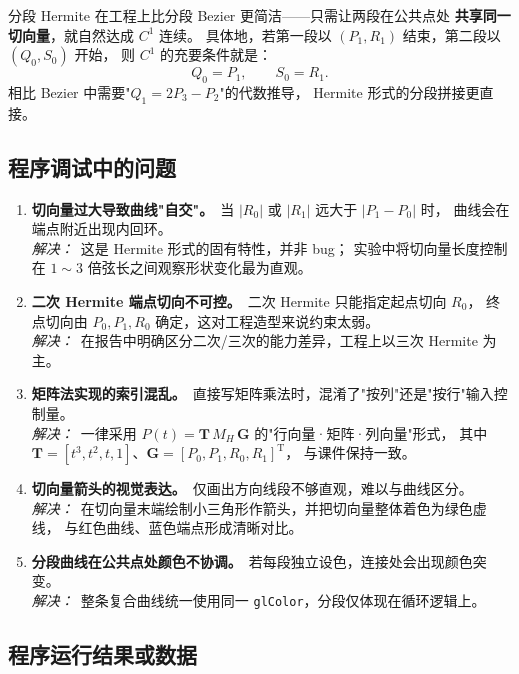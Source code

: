 \documentclass[a4paper,12pt]{ctexart}
\begin{document}
分段 Hermite 在工程上比分段 Bezier 更简洁——只需让两段在公共点处
\textbf{共享同一切向量}，就自然达成 $C^1$ 连续。
具体地，若第一段以 $(P_1,R_1)$ 结束，第二段以 $(Q_0,S_0)$ 开始，
则 $C^1$ 的充要条件就是：
\[
    Q_0 = P_1,\qquad S_0 = R_1.
\]
相比 Bezier 中需要"$Q_1=2P_3-P_2$"的代数推导，
Hermite 形式的分段拼接更直接。

\subsection{程序调试中的问题}

\begin{enumerate}[leftmargin=2em,itemsep=0.4em]
    \item \textbf{切向量过大导致曲线"自交"。}\ 当 $|R_0|$ 或 $|R_1|$ 远大于 $|P_1-P_0|$ 时，
        曲线会在端点附近出现内回环。\\
        \textit{解决：}\ 这是 Hermite 形式的固有特性，并非 bug；
        实验中将切向量长度控制在 $1\sim 3$ 倍弦长之间观察形状变化最为直观。

    \item \textbf{二次 Hermite 端点切向不可控。}\ 二次 Hermite 只能指定起点切向 $R_0$，
        终点切向由 $P_0,P_1,R_0$ 确定，这对工程造型来说约束太弱。\\
        \textit{解决：}\ 在报告中明确区分二次/三次的能力差异，工程上以三次 Hermite 为主。

    \item \textbf{矩阵法实现的索引混乱。}\ 直接写矩阵乘法时，混淆了"按列"还是"按行"输入控制量。\\
        \textit{解决：}\ 一律采用 $P(t)=\mathbf{T}\,M_H\,\mathbf{G}$ 的"行向量·矩阵·列向量"形式，
        其中 $\mathbf{T}=[t^3,t^2,t,1]$、$\mathbf{G}=[P_0,P_1,R_0,R_1]^\mathrm{T}$，
        与课件保持一致。

    \item \textbf{切向量箭头的视觉表达。}\ 仅画出方向线段不够直观，难以与曲线区分。\\
        \textit{解决：}\ 在切向量末端绘制小三角形作箭头，并把切向量整体着色为绿色虚线，
        与红色曲线、蓝色端点形成清晰对比。

    \item \textbf{分段曲线在公共点处颜色不协调。}\ 若每段独立设色，连接处会出现颜色突变。\\
        \textit{解决：}\ 整条复合曲线统一使用同一 \texttt{glColor}，分段仅体现在循环逻辑上。
\end{enumerate}

\subsection{程序运行结果或数据}
\end{document}
